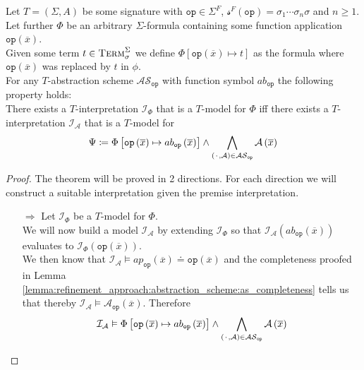 \begin{theorem}
\label{theorem:abstractions:scheme:equivalence}
Let $T=\left(\Sigma,A\right)$ be some signature with $\texttt{op}\in\Sigma^F$, $\mathcal{s}^F\left(\texttt{op}\right)=\sigma_1\dotsi\sigma_n\sigma$ and $n\geq1$.\\
Let further $\Phi$ be an arbitrary $\Sigma$-formula containing some function application $\texttt{op}\left(\overline{x}\right)$.\\
Given some term $t\in\textsc{Term}_\sigma^\Sigma$ we define $\Phi\left[\texttt{op}\left(\overline{x}\right)\mapsto t \right]$ as the formula where $\texttt{op}\left(\overline{x}\right)$ was replaced by $t$ in $\phi$.\\
For any $T$-abstraction scheme $\mathcal{AS}_{\texttt{op}}$ with function symbol $ab_{\texttt{op}}$ the following property holds:\\
There exists a $T$-interpretation $\mathcal{I}_{\Phi}$ that is a $T$-model for $\Phi$ iff there exists a $T$-interpretation $\mathcal{I}_{\mathcal{A}}$ that is a $T$-model for 
\[
\Psi \coloneqq \Phi\left[ \texttt{op}\left(\overline{x}\right) \mapsto ab_{\texttt{op}}\left(\overline{x}\right) \right] \land \bigwedge\limits_{\left({\mkern 2mu\cdot\mkern 2mu},\mathcal{A}\right)\in\mathcal{AS}_{\texttt{op}}} \mathcal{A}\left(\overline{x}\right)
\]
\begin{proof}
The theorem will be proved in 2 directions. For each direction we will construct a suitable interpretation given the premise interpretation.
\begin{itemize}
    \item[$\Rightarrow$] Let $\mathcal{I}_{\Phi}$ be a $T$-model for $\Phi$.\\
        We will now build a model $\mathcal{I}_{\mathcal{A}}$ by extending $\mathcal{I}_{\Phi}$ so that $\mathcal{I}_\mathcal{A}\left(ab_{\texttt{op}}\left(\overline{x}\right)\right)$
        evaluates to $\mathcal{I}_{\Phi}\left(\texttt{op}\left(\overline{x}\right)\right)$.\\
        We then know that $\mathcal{I}_{\mathcal{A}} \vDash ap_{\texttt{op}}\left(\overline{x}\right) \doteq \texttt{op}\left(\overline{x}\right)$
        and the completeness proofed in Lemma \ref{lemma:refinement_approach:abstraction_scheme:as_completeness} tells us that thereby
        $\mathcal{I}_{\mathcal{A}} \vDash \mathcal{A}_{\texttt{op}}\left(\overline{x}\right)$.
        Therefore 
        \[
            \mathcal{I}_{\mathcal{A}} \vDash\Phi\left[ \texttt{op}\left(\overline{x}\right) \mapsto ab_{\texttt{op}}\left(\overline{x}\right) \right] \land \bigwedge\limits_{\left({\mkern 2mu\cdot\mkern 2mu},\mathcal{A}\right)\in\mathcal{AS}_{\texttt{op}}} \mathcal{A}\left(\overline{x}\right)
\]
\end{itemize}
\end{proof}
\end{theorem}
